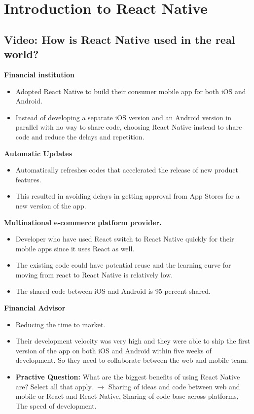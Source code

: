 \chapter{Introduction to React Native}

\section{Video: How is React Native used in the real world?}
\textbf{Financial institution}
\begin{itemize}
    \item Adopted React Native to build their consumer mobile app for both iOS and Android.
    \item Instead of developing a separate iOS version and an Android version in parallel with no way to share code, choosing React Native instead to share code and reduce the delays and repetition.
\end{itemize}

\textbf{Automatic Updates}
\begin{itemize}
    \item Automatically refreshes codes that accelerated the release of new product features.
    \item This resulted in avoiding delays in getting approval from App Stores for a new version of the app. 
\end{itemize}

\textbf{Multinational e-commerce platform provider.}
\begin{itemize}
    \item Developer who have used React switch to React Native quickly for their mobile apps since it uses React as well.
    \item The existing code could have potential reuse and the learning curve for moving from react to React Native is relatively low. 
    \item The shared code between iOS and Android is 95 percent shared.
\end{itemize}

\textbf{Financial Advisor}
\begin{itemize}
    \item Reducing the time to market.
    \item Their development velocity was very high and they were able to ship the first version of the app on both iOS and Android within five weeks of development. So they need to collaborate between the web and mobile team.
    \item \textbf{Practive Question:} What are the biggest benefits of using React Native are? Select all that apply.
    $\rightarrow$ Sharing of ideas and code between web and mobile or React and React Native, Sharing of code base across platforms, The speed of development.
\end{itemize}

